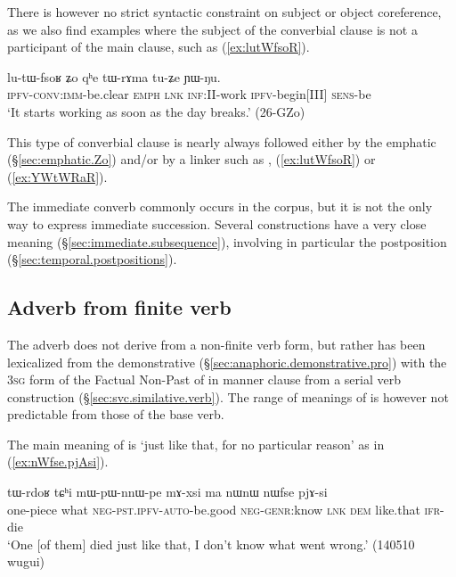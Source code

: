 There is however no strict syntactic constraint on subject or object coreference, as we also find examples where the subject of the converbial clause is not a participant of the main clause, such as (\ref{ex:lutWfsoR}). 

\begin{exe}
\ex \label{ex:lutWfsoR} 
\gll  lu-tɯ-fsoʁ ʑo qʰe tɯ-rɤma tu-ʑe ɲɯ-ŋu. \\
\textsc{ipfv}-\textsc{conv}:\textsc{imm}-be.clear \textsc{emph} \textsc{lnk} \textsc{inf}:\textsc{II}-work \textsc{ipfv}-begin[III] \textsc{sens}-be \\
\glt `It starts working as soon as the day breaks.' (26-GZo)
\end{exe}

This type of converbial clause is nearly always followed either by the emphatic  (§\ref{sec:emphatic.Zo}) and/or by a linker such as ,  (\ref{ex:lutWfsoR}) or  (\ref{ex:YWtWRaR}).

The immediate converb commonly occurs in the corpus, but it is not the only way to express immediate succession. Several constructions have a very close meaning (§\ref{sec:immediate.subsequence}), involving in particular the postposition  (§\ref{sec:temporal.postpositions}).

\subsection{Adverb from finite verb} \label{sec:nWfse}
The adverb  does not derive from a non-finite verb form, but rather has been lexicalized from the demonstrative  (§\ref{sec:anaphoric.demonstrative.pro}) with the \textsc{3sg} form of the Factual Non-Past of  in manner clause from a serial verb construction (§\ref{sec:svc.similative.verb}). The range of meanings of  is however not predictable from those of the base verb.

The main meaning of  is `just like that, for no particular reason' as in (\ref{ex:nWfse.pjAsi}). 
\begin{exe}
\ex \label{ex:nWfse.pjAsi}
\gll  tɯ-rdoʁ tɕʰi mɯ-pɯ-nnɯ-pe mɤ-xsi ma nɯnɯ nɯfse pjɤ-si \\
one-piece what \textsc{neg}-\textsc{pst}.\textsc{ipfv}-\textsc{auto}-be.good \textsc{neg}-\textsc{genr}:know \textsc{lnk} \textsc{dem} like.that \textsc{ifr}-die \\
\glt `One [of them] died just like that, I don't know what went wrong.' (140510 wugui) 
\end{exe}  

